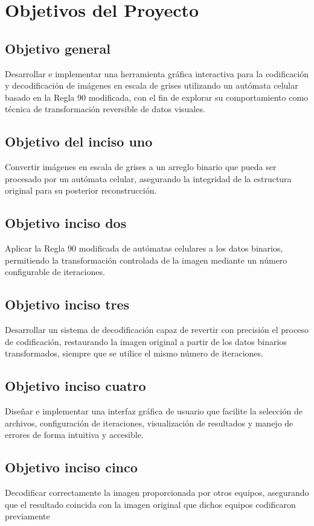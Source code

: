 \chapter{Objetivos del Proyecto}

\section{Objetivo general}
Desarrollar e implementar una herramienta gráfica interactiva para la codificación y decodificación de imágenes en escala de grises utilizando un autómata celular basado en la Regla 90 modificada, con el fin de explorar su comportamiento como técnica de transformación reversible de datos visuales.

\section{Objetivo del inciso uno}
Convertir imágenes en escala de grises a un arreglo binario que pueda ser procesado por un autómata celular, asegurando la integridad de la estructura original para su posterior reconstrucción.

\section{Objetivo inciso dos}
Aplicar la Regla 90 modificada de autómatas celulares a los datos binarios, permitiendo la transformación controlada de la imagen mediante un número configurable de iteraciones.

\section{Objetivo inciso tres}
Desarrollar un sistema de decodificación capaz de revertir con precisión el proceso de codificación, restaurando la imagen original a partir de los datos binarios transformados, siempre que se utilice el mismo número de iteraciones.

\section{Objetivo inciso cuatro}
Diseñar e implementar una interfaz gráfica de usuario que facilite la selección de archivos, configuración de iteraciones, visualización de resultados y manejo de errores de forma intuitiva y accesible.

\section{Objetivo inciso cinco}
Decodificar correctamente la imagen proporcionada por otros equipos, asegurando que el resultado coincida con la imagen original que dichos equipos codificaron previamente
